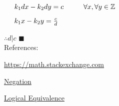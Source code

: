 \documentclass{article}
\begin{document}
$\hspace{0.5cm} k_1 d x - k_2 d y = c \hspace{1cm} \forall x, \forall y \in \mathbb{Z}$

$\hspace{0.5cm} k_1 x - k_2 y = \frac{c}{d}$

$\therefore d|c$ $\blacksquare$ \\





References:

\href{https://math.stackexchange.com/questions/304217/is-forall-x-exists-y-qx-y-the-same-as-exists-y-forall-x-qx-y}{https://math.stackexchange.com}

\href{https://www.math.toronto.edu/preparing-for-calculus/3_logic/we_3_negation.html}{Negation}

\href{https://www.csm.ornl.gov/~sheldon/ds/sec1.1.html}{Logical Equivalence}
\end{document}
